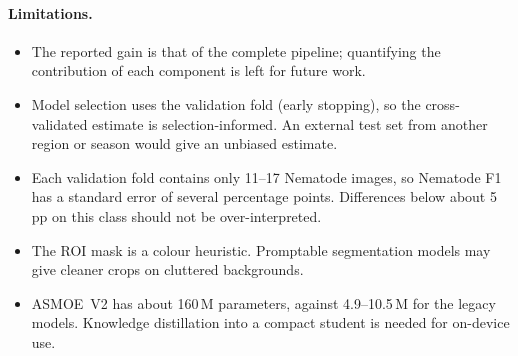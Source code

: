 \paragraph{Limitations.}
\begin{itemize}
  \item The reported gain is that of the complete pipeline; quantifying the contribution of each
  component is left for future work.
  \item Model selection uses the validation fold (early stopping), so the cross-validated estimate
  is selection-informed. An external test set from another region or season would give an unbiased
  estimate.
  \item Each validation fold contains only 11--17 Nematode images, so Nematode F1 has a standard
  error of several percentage points. Differences below about 5\,pp on this class should not be
  over-interpreted.
  \item The ROI mask is a colour heuristic. Promptable segmentation models may give cleaner crops on
  cluttered backgrounds.
  \item ASMOE~V2 has about 160\,M parameters, against 4.9--10.5\,M for the legacy models. Knowledge
  distillation into a compact student is needed for on-device use.
\end{itemize}
